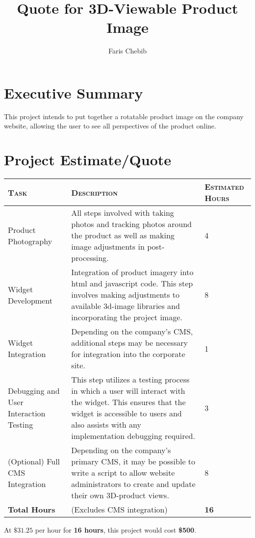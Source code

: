 \documentclass{article}
\title{Quote for 3D-Viewable Product Image}
\author{Faris Chebib}
\begin{document}
	\maketitle

	\section*{Executive Summary}
		This project intends to put together a rotatable product image on the
		company website, allowing the user to see all perspectives of the product
		online. 

	\section*{Project Estimate/Quote}
	\begin{tabular}{p{4cm} | p{9cm} | p{1cm}}
		\textsc{Task} & \textsc{Description} & \textsc{Estimated Hours} \\
		\hline
		Product Photography & All steps involved with taking photos and tracking
		photos around the product as well as making image adjustments in
		post-processing. & 4 \\

		Widget Development & Integration of product imagery into html and
		javascript code. This step involves making adjustments to available
		3d-image libraries and incorporating the project image. & 8 \\

		Widget Integration & Depending on the company's CMS, additional steps may
		be necessary for integration into the corporate site. & 1 \\

		Debugging and User Interaction Testing & This step utilizes a testing
		process in which a user will interact with the widget. This ensures that
		the widget is accessible to users and also assists with any implementation
		debugging required. & 3 \\

		(Optional) Full CMS Integration & Depending on the company's primary CMS,
		it may be possible to write a script to allow website administrators to
		create and update their own 3D-product views. & 8 \\

		\hline

		\textbf{Total Hours} & (Excludes CMS integration) & \textbf{16}
	\end{tabular}

	At $\$31.25$ per hour for \textbf{16 hours}, this project would cost \textbf{\$500}.
\end{document}
